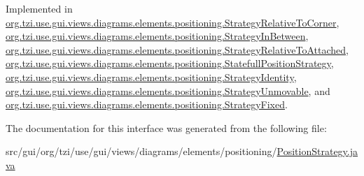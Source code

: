 Implemented in \hyperlink{classorg_1_1tzi_1_1use_1_1gui_1_1views_1_1diagrams_1_1elements_1_1positioning_1_1_strategy_relative_to_corner_a53205f8eb30efd78071149ebaf633e28}{org.\-tzi.\-use.\-gui.\-views.\-diagrams.\-elements.\-positioning.\-Strategy\-Relative\-To\-Corner}, \hyperlink{classorg_1_1tzi_1_1use_1_1gui_1_1views_1_1diagrams_1_1elements_1_1positioning_1_1_strategy_in_between_a75e03d00994442a942381dc43eae05e8}{org.\-tzi.\-use.\-gui.\-views.\-diagrams.\-elements.\-positioning.\-Strategy\-In\-Between}, \hyperlink{classorg_1_1tzi_1_1use_1_1gui_1_1views_1_1diagrams_1_1elements_1_1positioning_1_1_strategy_relative_to_attached_a520c964659293890e127eba1f135fbe0}{org.\-tzi.\-use.\-gui.\-views.\-diagrams.\-elements.\-positioning.\-Strategy\-Relative\-To\-Attached}, \hyperlink{classorg_1_1tzi_1_1use_1_1gui_1_1views_1_1diagrams_1_1elements_1_1positioning_1_1_statefull_position_strategy_a475a879a4a51b34c89632545b8f9d2e3}{org.\-tzi.\-use.\-gui.\-views.\-diagrams.\-elements.\-positioning.\-Statefull\-Position\-Strategy}, \hyperlink{classorg_1_1tzi_1_1use_1_1gui_1_1views_1_1diagrams_1_1elements_1_1positioning_1_1_strategy_identity_a2505e4a79153e367e73e05a2ce84a485}{org.\-tzi.\-use.\-gui.\-views.\-diagrams.\-elements.\-positioning.\-Strategy\-Identity}, \hyperlink{classorg_1_1tzi_1_1use_1_1gui_1_1views_1_1diagrams_1_1elements_1_1positioning_1_1_strategy_unmovable_a108c67b3a51bc3997fbdfc3448bde2f7}{org.\-tzi.\-use.\-gui.\-views.\-diagrams.\-elements.\-positioning.\-Strategy\-Unmovable}, and \hyperlink{classorg_1_1tzi_1_1use_1_1gui_1_1views_1_1diagrams_1_1elements_1_1positioning_1_1_strategy_fixed_aadbed3950fe334643c8ab48301aaa437}{org.\-tzi.\-use.\-gui.\-views.\-diagrams.\-elements.\-positioning.\-Strategy\-Fixed}.



The documentation for this interface was generated from the following file\-:\begin{DoxyCompactItemize}
\item 
src/gui/org/tzi/use/gui/views/diagrams/elements/positioning/\hyperlink{_position_strategy_8java}{Position\-Strategy.\-java}\end{DoxyCompactItemize}

